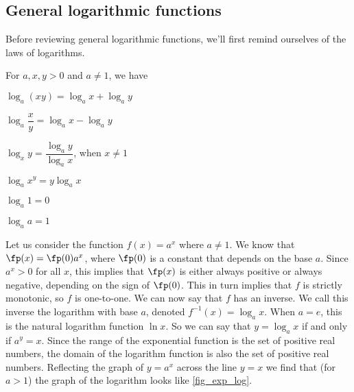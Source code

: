 \subsection{General logarithmic functions}

Before reviewing general logarithmic functions, we'll first remind ourselves of the laws of logarithms.

\begin{keyidea}\label{ki_log_laws}%
For $a,x,y>0$ and $a\ne1$, we have
\begin{enumext*}[columns=2]
\item$\log_a(xy)=\log_ax+\log_ay$
\item$\log_a\dfrac xy=\log_ax-\log_ay$\vspace{-.5ex}
\item$\log_xy=\dfrac{\log_ay}{\log_ax}$, when $x\ne1$
\item$\log_ax^y=y\log_ax$
\item$\log_a1=0$
\item$\log_aa=1$
\end{enumext*}
\end{keyidea}

Let us consider the function $f(x)=a^x$ where $a\neq1$. We know that $\fp(x)=\fp(0)a^x$, where $\fp(0)$ is a constant that depends on the base $a$. Since $a^x>0$ for all $x$, this implies that $\fp(x)$ is either always positive or always negative, depending on the sign of $\fp(0)$. This in turn implies that $f$ is strictly monotonic, so $f$ is one-to-one. We can now say that $f$ has an inverse. We call this inverse the logarithm with base $a$, denoted $f^{-1}(x)=\log_ax$. When $a=e$, this is the natural logarithm function $\ln x$. So we can say that $y=\log_a x$ if and only if $a^y=x$. Since the range of the exponential function is the set of positive real numbers, the domain of the logarithm function is also the set of positive real numbers. Reflecting the graph of $y=a^x$ across the line $y=x$ we find that (for $a>1$) the graph of the logarithm looks like \autoref{fig_exp_log}.


